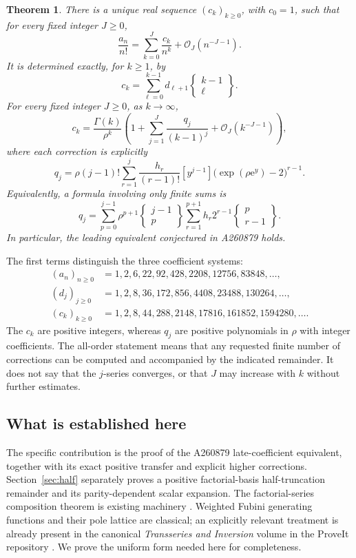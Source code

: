 \documentclass[11pt,letterpaper]{article}
\numberwithin{equation}{section}
\newtheorem{theorem}{Theorem}[section]
\theoremstyle{remark}\newtheorem{remark}[theorem]{Remark}
\newcommand{\e}{\mathrm e}
\newcommand{\Ord}{\mathcal O}
\newcommand{\stir}[2]{\left\{\begin{smallmatrix}#1\\#2\end{smallmatrix}\right\}}
\begin{document}
\begin{theorem}\label{thm:main}
There is a unique real sequence $(c_k)_{k\ge0}$, with $c_0=1$, such that for every fixed integer $J\ge0$,
\begin{equation}\label{eq:a-asym}
 \frac{a_n}{n!}=\sum_{k=0}^{J}\frac{c_k}{n^k}
                +\Ord_J(n^{-J-1}).
\end{equation}
It is determined exactly, for $k\ge1$, by
\begin{equation}\label{eq:c-exact}
 c_k=\sum_{\ell=0}^{k-1}d_{\ell+1}\stir{k-1}{\ell}.
\end{equation}
For every fixed integer $J\ge0$, as $k\to\infty$,
\begin{equation}\label{eq:c-asym}
 c_k=\frac{\Gamma(k)}{\rho^k}
       \left(1+\sum_{j=1}^{J}\frac{q_j}{(k-1)^j}
                        +\Ord_J(k^{-J-1})\right),
\end{equation}
where each correction is explicitly
\begin{equation}\label{eq:q-generator}
 q_j=\rho(j-1)!\sum_{r=1}^{j}\frac{h_r}{(r-1)!}
       [y^{j-1}]\bigl(\exp(\rho\e^y)-2\bigr)^{r-1}.
\end{equation}
Equivalently, a formula involving only finite sums is
\begin{equation}\label{eq:q-stirling}
 q_j=\sum_{p=0}^{j-1}\rho^{p+1}\stir{j-1}{p}
              \sum_{r=1}^{p+1}h_r2^{r-1}\stir{p}{r-1}.
\end{equation}
In particular, the leading equivalent conjectured in A260879 holds.
\end{theorem}

The first terms distinguish the three coefficient systems:
\begin{align*}
 (a_n)_{n\ge0}&=1,2,6,22,92,428,2208,12756,83848,\ldots,\\
 (d_j)_{j\ge0}&=1,2,8,36,172,856,4408,23488,130264,\ldots,\\
 (c_k)_{k\ge0}&=1,2,8,44,288,2148,17816,161852,1594280,\ldots.
\end{align*}
The $c_k$ are positive integers, whereas $q_j$ are positive polynomials in $\rho$ with integer coefficients. The all-order statement means that any requested finite number of corrections can be computed and accompanied by the indicated remainder. It does not say that the $j$-series converges, or that $J$ may increase with $k$ without further estimates.

\subsection{What is established here}
The specific contribution is the proof of the A260879 late-coefficient equivalent, together with its exact positive transfer and explicit higher corrections. Section~\ref{sec:half} separately proves a positive factorial-basis half-truncation remainder and its parity-dependent scalar expansion. The factorial-series composition theorem is existing machinery \cite{bender,borinsky}. Weighted Fubini generating functions and their pole lattice are classical; an explicitly relevant treatment is already present in the canonical \emph{Transseries and Inversion} volume in the ProveIt repository \cite{proveit}. We prove the uniform form needed here for completeness.
\end{document}
